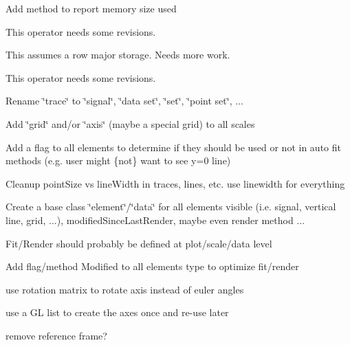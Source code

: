 \begin{DoxyRefList}
Add method to report memory size used  
\item[\label{todo__todo000002}%
\hypertarget{todo__todo000002}{}%
Member \hyperlink{classvct_dynamic_matrix_a8c20bdf6d0df4b4271cb970dd8f225bd}{vct\+Dynamic\+Matrix$<$ \+\_\+element\+Type $>$\+:\+:operator=} (const vct\+Return\+Dynamic\+Matrix$<$ value\+\_\+type $>$ \&other\+Matrix)]This operator needs some revisions.  
\item[\label{todo__todo000001}%
\hypertarget{todo__todo000001}{}%
Member \hyperlink{classvct_dynamic_matrix_ac0062998c00df7a4e5155c3eac8fddb0}{vct\+Dynamic\+Matrix$<$ \+\_\+element\+Type $>$\+:\+:operator=} (const vct\+Dynamic\+Const\+Matrix\+Base$<$ \+\_\+\+\_\+matrix\+Owner\+Type, \+\_\+\+\_\+element\+Type $>$ \&other\+Matrix)]This assumes a row major storage. Needs more work.  
\item[\label{todo__todo000003}%
\hypertarget{todo__todo000003}{}%
Member \hyperlink{classvct_dynamic_n_array_a46790594f24b17dd1f5c808210cf36c8}{vct\+Dynamic\+N\+Array$<$ \+\_\+element\+Type, \+\_\+dimension $>$\+:\+:operator=} (const vct\+Return\+Dynamic\+N\+Array$<$ value\+\_\+type, \+\_\+dimension $>$ \&other\+N\+Array)]This operator needs some revisions.  
\item[\label{todo__todo000004}%
\hypertarget{todo__todo000004}{}%
Class \hyperlink{classvct_plot2_d_base}{vct\+Plot2\+D\+Base} ]Rename \char`\"{}trace\char`\"{} to \char`\"{}signal\char`\"{}, \char`\"{}data set\char`\"{}, \char`\"{}set\char`\"{}, \char`\"{}point set\char`\"{}, ... 

Add \char`\"{}grid\char`\"{} and/or \char`\"{}axis\char`\"{} (maybe a special grid) to all scales 

Add a flag to all elements to determine if they should be used or not in auto fit methods (e.\+g. user might \{not\} want to see y=0 line) 

Cleanup point\+Size vs line\+Width in traces, lines, etc. use linewidth for everything 

Create a base class \char`\"{}element\char`\"{}/\char`\"{}data\char`\"{} for all elements visible (i.\+e. signal, vertical line, grid, ...), modified\+Since\+Last\+Render, maybe even render method ... 

Fit/\+Render should probably be defined at plot/scale/data level 

Add flag/method Modified to all elements type to optimize fit/render  
\item[\label{todo__todo000005}%
\hypertarget{todo__todo000005}{}%
Class \hyperlink{classvct_qt_widget_rotation_open_g_l}{vct\+Qt\+Widget\+Rotation\+Open\+G\+L} ]use rotation matrix to rotate axis instead of euler angles 

use a G\+L list to create the axes once and re-\/use later 

remove reference frame? 
\end{DoxyRefList}
